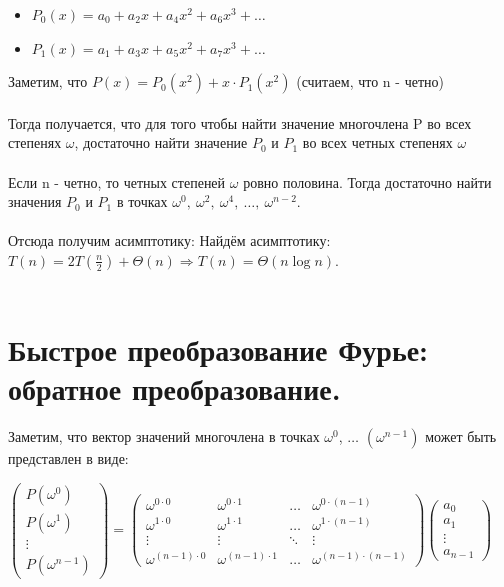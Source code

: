 \begin{itemize}
    \item  $P_0 (x) = a_0 + a_2 x + a_4 x^2 + a_6 x^3 + \dots$
    \item $P_1 (x) = a_1 + a_3 x + a_5 x^2 + a_7 x^3 + \dots$
\end{itemize}
Заметим, что $P (x) = P_0 (x^2) + x \cdot P_1 (x^2)$ (считаем, что n -  четно)
\\
\\
Тогда получается, что для того чтобы найти значение многочлена P во всех степенях $\omega$, достаточно найти значение $P_0$ и $P_1$ во всех четных степенях $\omega$
\\
\\
Если n - четно, то четных степеней $\omega$ ровно половина. Тогда достаточно найти значения $P_0$ и $P_1$ в точках $\omega^0, \ \omega^2, \ \omega^4, \ \dots, \ \omega^{n - 2}$.
\\
\\
Отсюда получим асимптотику: Найдём асимптотику: $T(n) = 2 T (\frac{n}{2}) + \Theta (n) \Longrightarrow T (n) = \Theta (n \log n)$.
\\ \\
\newpage{}

\section{Быстрое преобразование Фурье: обратное преобразование.}
Заметим, что вектор значений многочлена в точках ${\omega^0}$, $\dots$ $(\omega^{n - 1})$ может быть представлен в виде:

\begin{center}
    $\left( \begin{matrix} P(\omega^0) \\P(\omega^1) \\ \vdots \\ P(\omega^{n-1}) \end{matrix}\right)  = \left( \begin{matrix} \omega^{0 \cdot 0} & \omega^{0 \cdot 1} & \dots & \omega^{0 \cdot (n - 1)} \\ \omega^{1 \cdot 0} & \omega^{1 \cdot 1} & \dots & \omega^{1 \cdot (n - 1)} \\ \vdots & \vdots & \ddots & \vdots \\ \omega^{(n - 1) \cdot 0} & \omega^{(n - 1) \cdot 1} & \dots & \omega^{(n - 1) \cdot (n - 1)}   \end{matrix} \right)\left( \begin{matrix} a_0 \\ a_1 \\ \vdots \\ a_{n-1} \end{matrix}\right)$
\end{center}

